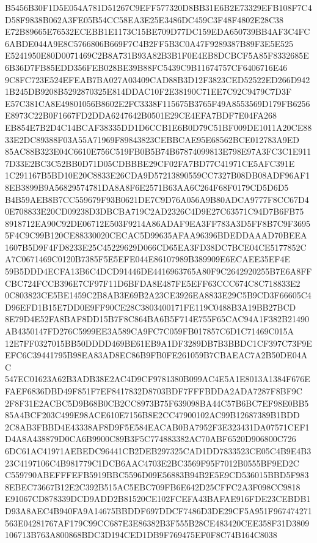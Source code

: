 \documentclass[UTF8,fontset=fandol,zihao=-4,a4paper]{ctexart}
\begin{document}
{{B5456B30F1D5E054A781D51267C9EFF577320D8BB31E6B2E73329EFB108F7C4D58F9838B062A3FE05B54CC58EA3E25E3486DC459C3F48F4802E28C38
E72B89665E76532ECEBB1E1173C15BE709D77DC159EDA650739BB4AF3C4FC6ABDE044A9E8C5766806B669F7C4B2FF5B3C0A47F9289387B89F3E5E525
E5241950E80D0071469C2B8A731B93A82B3B1F0E4EB8DCBCF5A85F8332685E6B36D7FB85EDD356FEB028BE39B88FC5439C9B11674757CF6406716E46
9C8FC723E524EFEAB7BA027A03409CAD88B3D12F3823CED52522ED266D9421B245DB9208B5292870325E814DDAC10F2E38190C71EE7C92C9479C7D3F
E57C381CA8E49801056B8602E2FC3338F115675B3765F49A8553569D179FB6256E8973C22B0F1667FD2DDA6247642B0501E29CE4EFA7BDF7E04FA268
EB854E7B2D4C14BCAF38335DD1D6CCB1E6B0D79C51BF009DE1011A20CE8833E2DC89388F03A55A71969F89843823CEBBCAE95E68562BCE012783A9ED
85AC88B323E04C6610E756C519FB0B5B74B67874099813E798E97A3FC3C1E9117D33E2BC3C52BB0D71D05CDBBBE29CF02FA7BD77C41971CE5AFC391E
1C291167B5BD10E20C8833E26CDA9D57213890559CC7327B08DB08ADF96AF18EB3899B9A56829574781DA8A8F6E2571B63AA6C264F68F0179CD5D6D5
B4B59AEB8B7CC559679F93B0621DE7C9D76A056A9B80ADCA9777F8CC67D40E708833E20CD09238D3DBCBA719C2AD2326C4D9E27C63571C94D7B6FB75
8918712EA90C92DE06712E503F9214A86ADAF9EA3FF783A3D5FF8B7C9F36955F4C9C99B120CE88330020CECAC5D99635AFAA96396BDEDDAAAD70BEEA
1607B5D9F4FD8233E25C45229629D066CD65EA3FD38DC7BCE04CE5177852CA7C0671469C0120B7385F5E5EFE044E86107989B389909E6ECAEE35EF4E
59B5DDD4ECFA13B6C4DCD91446DE4416963765A80F9C2642920255B7E6A8FFCBC724FCCB396E7CF97F11D6BFDA8E487FE5EFF63CCC674C8C718833E2
0C803823CE5BE1459C2B8AB3E69B2A23CE3926EA8833E29C5B9CD3F66605C4D96EFD1B15E7DD0E9FF90CE28C3803400171FE119C0488B3A19BB27BCD
8E79D4E52FA8BAF8DD15B7F8C864BA6B5F714E755F65CAC94A1F382B21490AB4350147FD276C5999EE3A589CA9FC7C059FB017857C6D1C71469C015A
12E7FF0327015BB50DDDD469BE61EB9A1DF3289DB7B3BBDC1CF397C73F9EEFC6C39441795B98EA83AD8EC86B9FB0FE261059B7CBAEAC7A2B50DE04AC
547EC01623A62B3ADB38E2AC4D9CF9781380B099AC4E5A1E8013A1384F676EFAEF6836DBD49F851F7EF8417832D8703BDF7FFFBDDA2ADA7287F8BF9C
2F8F31E2ACBC5D9B68B0CB2CC8973B75F639098BA44C57B6BC7EF98E0BB585A4BCF203C499E98ACE610E7156B8E2CC47900102AC99B12687389B1BDD
2C8AB3FBBD4E43338AF8D9F5E584EACAB0BA7952F3E323431DA07571CEF1D4A8A438879D0CA6B9900C89B3F5C774883382AC70ABF6520D906800C726
6DC61AC41971AEBEDC96441CB2DEB297325CAD1DD7833523CE05C4B9E4B323C4197106C4B981779C1DCB6AAC4703E2BC3569F95F7012B0555BF9ED2C
C559790ABEFFFEFB5919BBC5596D09E56883B94B2E5E9CD536015BBD5F9838EBEC73667B12E2C392B515AC5EBC709FB6E642D25CFFC2A3F098CC9818
E91067CD878339DCD9ADD2B81520CE102FCEFA43BAFAE916FDE23CEBDB1D93A8AEC4B940FA9A14675BBDDF697DDCF7486D3DE29CF5A951F967474271
563E04281767AF179C99CC687E3E86382B3F555B28CE483420CEE358F31D3809106713B763A800868BDC3D194CED1DB9F769475EF0F8C74B164C8038
}}
\end{document}

